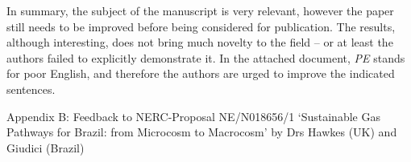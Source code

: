 \documentclass[14pt,twoside]{report}
\begin{document}
In summary, the subject of the manuscript is very relevant, however the paper still needs to be improved before being considered for publication. The results, although interesting, does not bring much novelty to the field -- or at least the authors failed to explicitly demonstrate it.  In the attached document, {\it PE} stands for poor English, and therefore the authors are urged to improve the indicated sentences.

{
  }



\clearpage



\begin{center}
  {\Large Appendix B: Feedback to NERC-Proposal NE/N018656/1 `Sustainable Gas Pathways for Brazil: from Microcosm to Macrocosm' by Drs Hawkes (UK) and Giudici (Brazil)}
\end{center}
\end{document}
